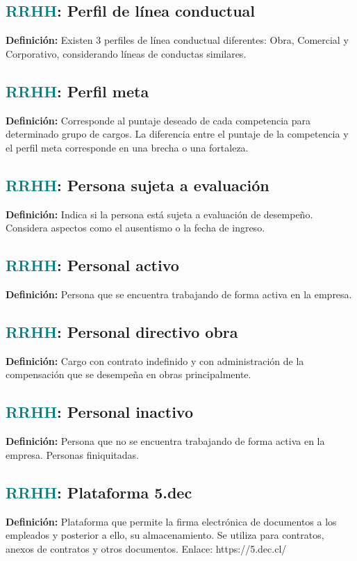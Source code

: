 \documentclass[12pt]{article}
\begin{document}
\subsection{\textcolor{teal}{RRHH}: Perfil de línea conductual}
\textbf{Definición:} Existen 3 perfiles de línea conductual diferentes: Obra, Comercial y Corporativo, considerando líneas de conductas similares.
\subsection{\textcolor{teal}{RRHH}: Perfil meta}
\textbf{Definición:} Corresponde al puntaje deseado de cada competencia para determinado grupo de cargos. La diferencia entre el puntaje de la competencia y el perfil meta corresponde en una brecha o una fortaleza.
\subsection{\textcolor{teal}{RRHH}: Persona sujeta a evaluación}
\textbf{Definición:} Indica si la persona está sujeta a evaluación de desempeño. Considera aspectos como el ausentismo o la fecha de ingreso.
\subsection{\textcolor{teal}{RRHH}: Personal activo}
\textbf{Definición:} Persona que se encuentra trabajando de forma activa en la empresa.
\subsection{\textcolor{teal}{RRHH}: Personal directivo obra}
\textbf{Definición:} Cargo con contrato indefinido y con administración de la compensación que se desempeña en obras principalmente.
\subsection{\textcolor{teal}{RRHH}: Personal inactivo}
\textbf{Definición:} Persona que no se encuentra trabajando de forma activa en la empresa. Personas finiquitadas.
\subsection{\textcolor{teal}{RRHH}: Plataforma 5.dec}
\textbf{Definición:} Plataforma que permite la firma electrónica de documentos a los empleados y posterior a ello, su almacenamiento. Se utiliza para contratos, anexos de contratos y otros documentos. 
Enlace: https://5.dec.cl/
\end{document}
